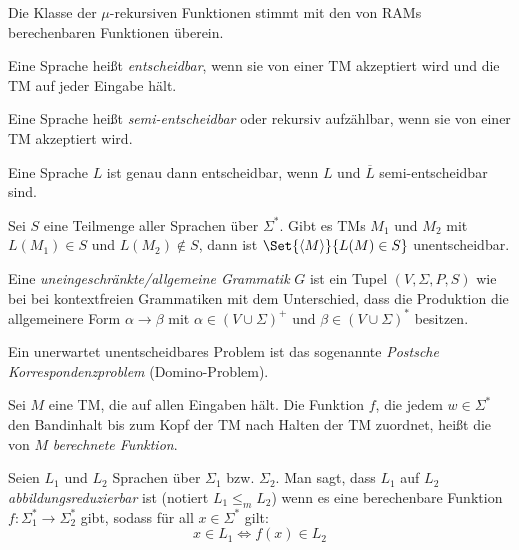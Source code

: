 \documentclass{cheat-sheet}
\begin{document}
\begin{bem}
Die Klasse der $\mu$-rekursiven Funktionen stimmt mit den von RAMs berechenbaren Funktionen überein.
\end{bem}

\begin{definition}
Eine Sprache heißt \emph{entscheidbar}, wenn sie von einer TM akzeptiert wird und die TM auf jeder Eingabe hält.
\end{definition}

\begin{definition}
Eine Sprache heißt \emph{semi-entscheidbar} oder rekursiv aufzählbar, wenn sie von einer TM akzeptiert wird.
\end{definition}

\begin{satz}
Eine Sprache $L$ ist genau dann entscheidbar, wenn $L$ und $\overline{L}$ semi-entscheidbar sind.
\end{satz}

\begin{satz}
Sei $S$ eine Teilmenge aller Sprachen über $\Sigma^{*}$. Gibt es TMs $M_{1}$ und $M_{2}$ mit $L(M_{1}) \in S$ und $L(M_{2}) \not\in S$, dann ist $\Set{ \langle M \rangle }{ L(M) \in S }$ unentscheidbar.
\end{satz}

\begin{definition}
Eine \emph{uneingeschränkte/allgemeine Grammatik} $G$ ist ein Tupel $(V, \Sigma, P, S)$ wie bei bei kontextfreien Grammatiken mit dem Unterschied, dass die Produktion die allgemeinere Form $\alpha \longrightarrow \beta$ mit $\alpha \in (V \cup \Sigma)^{+}$ und $\beta \in (V \cup \Sigma)^{*}$ besitzen.
\end{definition}

\begin{bem}
Ein unerwartet unentscheidbares Problem ist das sogenannte \emph{Postsche Korrespondenzproblem} (Domino-Problem).
\end{bem}

\begin{definition}
Sei $M$ eine TM, die auf allen Eingaben hält. Die Funktion $f$, die jedem $w \in \Sigma^{*}$ den Bandinhalt bis zum Kopf der TM nach Halten der TM zuordnet, heißt die von $M$ \emph{berechnete Funktion}.
\end{definition}

\begin{definition}
Seien $L_{1}$ und $L_{2}$ Sprachen über $\Sigma_{1}$ bzw. $\Sigma_{2}$. Man sagt, dass $L_{1}$ auf $L_{2}$ \emph{abbildungsreduzierbar} ist (notiert $L_{1} \le_{m} L_{2}$) wenn es eine berechenbare Funktion $f : \Sigma_{1}^{*} \to \Sigma_{2}^{*}$ gibt, sodass für all $x \in \Sigma^{*}$ gilt:
  \[ x \in L_{1} \Leftrightarrow f(x) \in L_{2} \]
\end{definition}
\end{document}
